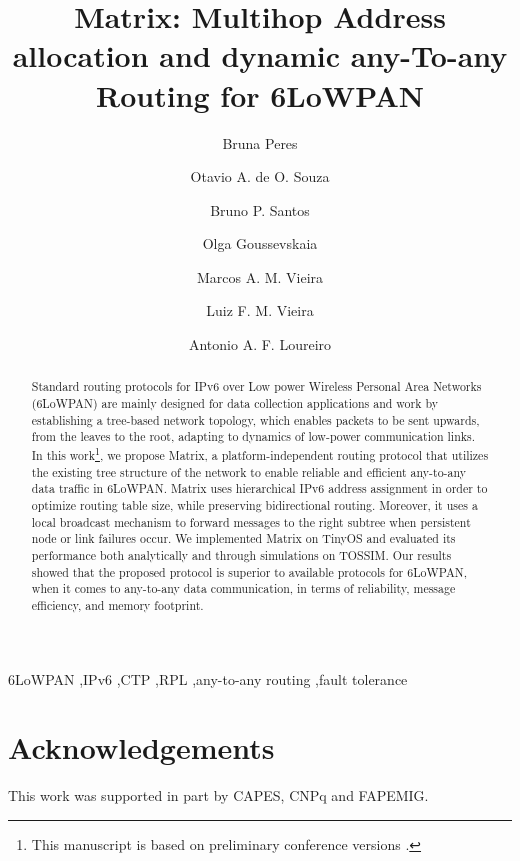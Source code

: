\documentclass[review]{elsarticle}
\begin{document}
\begin{frontmatter}

\title{Matrix: Multihop Address allocation and dynamic any-To-any Routing for
6LoWPAN}

\author[ufmgaddress]{Bruna Peres}

\author[ufmgaddress]{Otavio A. de O. Souza}

\author[ufmgaddress]{Bruno P. Santos}

\author[ufmgaddress]{Olga Goussevskaia}

\author[ufmgaddress]{Marcos A. M. Vieira}

\author[ufmgaddress]{Luiz F. M. Vieira}

\author[ufmgaddress]{Antonio A. F. Loureiro}

\address[ufmgaddress]{Computer Science Department, Universidade Federal de Minas Gerais (UFMG)\\ Av. Antonio Carlos 6627, Belo Horizonte, MG, Brazil.}



\begin{abstract}
Standard routing protocols for IPv6 over Low power Wireless Personal
Area Networks (6LoWPAN) are mainly designed for data collection
applications and work by establishing a tree-based network topology,
which enables packets to be sent upwards, from the leaves to the
root, adapting to dynamics of low-power communication links. 
In this work\footnote{This manuscript is based on preliminary conference versions \cite{peres:2016, mhclSBRC}.}, we propose Matrix, a platform-independent
routing protocol that utilizes the existing tree structure of the
network to enable reliable and efficient any-to-any data traffic in 6LoWPAN.
Matrix uses hierarchical IPv6 address assignment in order to
optimize routing table size, while preserving bidirectional routing.
Moreover, it uses a local broadcast mechanism to forward messages to
the right subtree when persistent node or link failures occur. We
implemented Matrix on TinyOS and evaluated its performance both
analytically and through simulations on TOSSIM. Our results showed
that the proposed protocol is superior to available protocols for 6LoWPAN, when it
comes to any-to-any data communication, in terms of reliability, message efficiency, and memory footprint.
\end{abstract}

\begin{keyword}
6LoWPAN \sep IPv6 \sep CTP \sep RPL \sep any-to-any routing \sep fault tolerance
\end{keyword}


\end{frontmatter}

\linenumbers






\section*{Acknowledgements }
This work was supported in part by CAPES, CNPq and FAPEMIG.



\end{document}
